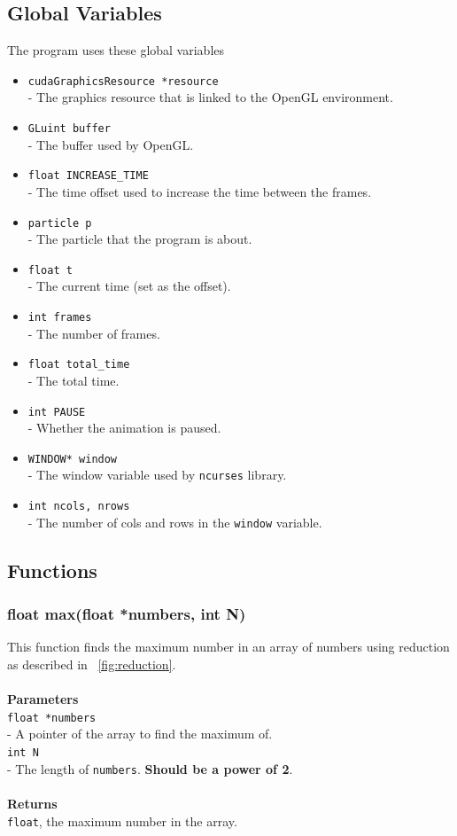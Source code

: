 \documentclass[a4paper, 10pt]{article}
\def\mar{\hspace*{5mm}}
\begin{document}
    \subsection{Global Variables}
    The program uses these global variables
    \begin{itemize}
        \item \verb|cudaGraphicsResource *resource|\\\mar- The graphics resource that is
              linked to the OpenGL environment.
        \item \verb|GLuint buffer|\\\mar- The buffer used by OpenGL.
        \item \verb|float INCREASE_TIME|\\\mar- The time offset used to increase the time
              between the frames.
        \item \verb|particle p|\\\mar- The particle that the program is about.
        \item \verb|float t|\\\mar- The current time (set as the offset).
        \item \verb|int frames|\\\mar- The number of frames.
        \item \verb|float total_time|\\\mar- The total time.
        \item \verb|int PAUSE|\\\mar- Whether the animation is paused.
        \item \verb|WINDOW* window|\\\mar- The window variable used by \verb|ncurses| library.
        \item \verb|int ncols, nrows|\\\mar- The number of cols and rows in the \verb|window| variable.
    \end{itemize}

    \newpage
    \subsection{Functions}
        \vspace{1cm}
        \subsubsection{float max(float *numbers, int N)}
        This function finds the maximum number in an array of numbers using reduction
        as described in ~\ref{fig:reduction}.\\
        \\{\bf Parameters}\\
        \verb|float *numbers|\\\mar- A pointer of the array to find the maximum of.\\
        \verb|int N|\\\mar- The length of \verb|numbers|. {\bf Should be a power of 2}.\\
        \\{\bf Returns}\\
        \verb|float|, the maximum number in the array.
\end{document}
